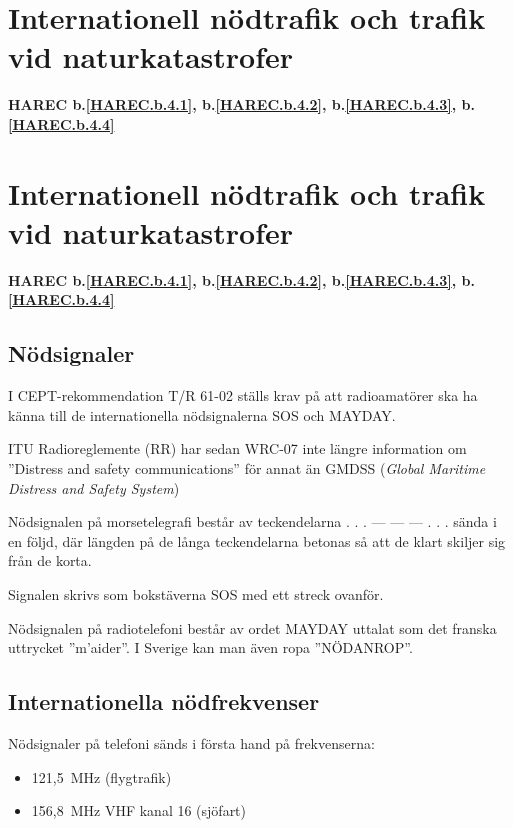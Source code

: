 \section{Internationell nödtrafik och trafik vid naturkatastrofer}
\textbf{
	HAREC b.\ref{HAREC.b.4.1}\label{myHAREC.b.4.1},
	b.\ref{HAREC.b.4.2}\label{myHAREC.b.4.2},
	b.\ref{HAREC.b.4.3}\label{myHAREC.b.4.3},
	b.\ref{HAREC.b.4.4}\label{myHAREC.b.4.4}
}

\section{Internationell nödtrafik och trafik vid naturkatastrofer}
\textbf{
	HAREC b.\ref{HAREC.b.4.1}\label{myHAREC.b.4.1},
	b.\ref{HAREC.b.4.2}\label{myHAREC.b.4.2},
	b.\ref{HAREC.b.4.3}\label{myHAREC.b.4.3},
	b.\ref{HAREC.b.4.4}\label{myHAREC.b.4.4}
}

\subsection{Nödsignaler}

I CEPT-rekommendation T/R 61-02 ställs krav på att radioamatörer ska ha känna
till de internationella nödsignalerna SOS och MAYDAY.

ITU Radioreglemente (RR) har sedan WRC-07 inte längre information om
''Distress and safety communications'' för annat än GMDSS (\emph{Global Maritime Distress and Safety System})

Nödsignalen på morsetelegrafi består av teckendelarna . . . --- --- --- . . .
sända i en följd, där längden på de långa teckendelarna betonas så att de klart
skiljer sig från de korta.

Signalen skrivs som bokstäverna SOS med ett streck ovanför.

Nödsignalen på radiotelefoni består av ordet MAYDAY uttalat som det franska
uttrycket ''m'aider''. I Sverige kan man även ropa ''NÖDANROP''.

\subsection{Internationella nödfrekvenser}

Nödsignaler på telefoni sänds i första hand på frekvenserna:
\begin{itemize}
	\item 121,5~MHz (flygtrafik)
	\item 156,8~MHz VHF kanal 16 (sjöfart)
\end{itemize}

